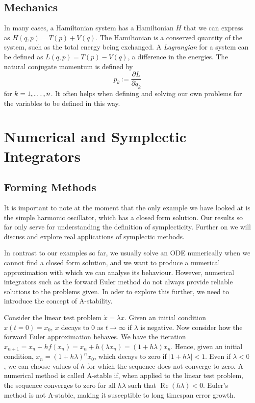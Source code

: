 \documentclass{report}
\theoremstyle{exampstyle} \newtheorem{example}[theorem]{Example}
\theoremstyle{exampstyle} \newtheorem{remark}[theorem]{Remark}
\theoremstyle{exampstyle} \newtheorem{definition}[theorem]{Definition}
\theoremstyle{exampstyle} \newtheorem{lemma}[theorem]{Lemma}
\begin{document}
\subsection{Mechanics}

In many cases, a Hamiltonian system has a Hamiltonian $H$ that we can express as $H(q,p) = T(p) + V(q)$.
The Hamiltonian is a conserved quantity of the system, such as the total energy being exchanged.
A \textit{Lagrangian} for a system can be defined as $L(q,p) = T(p) - V(q)$,
a difference in the energies.
The natural conjugate momentum is defined by
\begin{equation}
	p_k := \dfrac{\partial L}{\partial \dot{q}_k}
\end{equation}
for $k = 1,\mathellipsis,n$.
It often helps when defining and solving our own problems for the variables to be defined in this way.

\section{Numerical and Symplectic Integrators}

\subsection{Forming Methods}
It is important to note at the moment that the only example we have looked at is the simple harmonic oscillator, which has a closed form solution.
Our results so far only serve for understanding the definition of symplecticity.
Further on we will discuss and explore real applications of symplectic methods.

In contrast to our examples so far, we usually solve an ODE numerically when we cannot find a closed form solution, and we want to produce a numerical approximation with which we can analyse its behaviour.
However, numerical integrators such as the forward Euler method do not always provide reliable solutions to the problems given.
In oder to explore this further, we need to introduce the concept of A-stability.

Consider the linear test problem $\dot{x} = \lambda x$. Given an initial condition $x(t=0) = x_0$, $x$ decays to $0$ as $t \rightarrow \infty$ if $\lambda$ is negative.
Now consider how the forward Euler approximation behaves.
We have the iteration $x_{n+1} = x_n + hf(x_n) = x_n + h(\lambda x_n) = (1 + h\lambda)x_n$.
Hence, given an initial condition, $x_n = (1 + h\lambda)^n x_0$, which decays to zero if $|1+h\lambda| < 1$.
Even if $\lambda < 0$, we can choose values of $h$ for which the sequence does not converge to zero.
A numerical method is called A-stable if, when applied to the linear test problem, the sequence converges to zero for all $h\lambda$ such that $\operatorname{Re}(h\lambda) < 0$.
Euler's method is not A-stable, making it susceptible to long timespan error growth.
\end{document}

